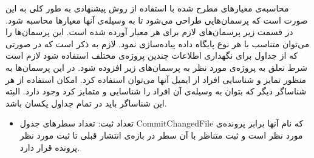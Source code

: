 محاسبه‌ی معیارهای مطرح شده با استفاده از روش پیشنهادی به طور کلی به این صورت است که پرسمان‌هایی طراحی می‌شود تا به وسیله‌ی آنها معیارها محاسبه شود. در قسمت زیر پرسمان‌های لازم  برای هر معیار آورده شده است. این پرسمان‌ها را می‌توان متناسب با هر نوع پایگاه داده پیاده‌سازی نمود. لازم به ذکر است که در صورتی که از جداول برای نگهداری اطلاعات چندین پروژه‌ی مختلف استفاده  شود لازم است شرط تعلق به پروژه‌ی مورد نظر به پرسمان‌های زیر افزوده شود.  در این پرسمان‌ها به منظور تمایز و شناسایی افراد از ایمیل‌ آنها می‌توان استفاده کرد.   امکان استفاده از هر شناساگر دیگر که بتوان به وسیله‌ی آن افراد را شناسایی و متمایز کرد وجود دارد. البته این شناساگر باید در تمام جداول یکسان باشد. 
\begin{itemize}
	\item 
	تعداد ثبت:  تعداد سطر‌های جدول CommitChangedFile که نام آنها برابر پرونده‌ی مورد نظر است و ثبت متناظر با آن سطر در بازه‌ی انتشار قبلی تا ثبت مورد نظر پرونده قرار دارد.
	

\end{itemize}
